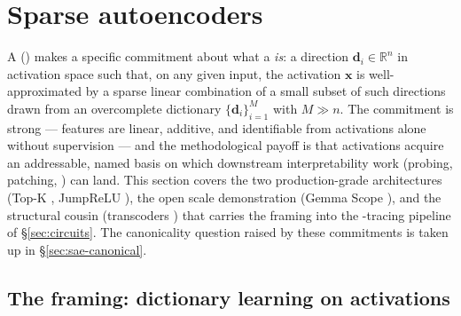 
\section{Sparse autoencoders}
\label{sec:sparse-autoencoders}

A  () makes a specific commitment about what a
 \emph{is}: a direction $\mathbf{d}_i \in \mathbb{R}^n$ in
activation space such that, on any given input, the activation
$\mathbf{x}$ is well-approximated by a sparse linear combination of a
small subset of such directions drawn from an overcomplete dictionary
$\{\mathbf{d}_i\}_{i=1}^M$ with $M \gg n$. The commitment is strong —
features are linear, additive, and identifiable from activations alone
without supervision — and the methodological payoff is that activations
acquire an addressable, named basis on which downstream interpretability
work (probing, patching, ) can land. This section covers
the two production-grade architectures (Top-K \citep{gao2024-topk-saes},
JumpReLU \citep{rajamanoharan2024-jumprelu}), the open scale
demonstration (Gemma Scope \citep{gemma-scope-2024}), and the structural
cousin (transcoders \citep{dunefsky2024-transcoders}) that carries the
framing into the -tracing pipeline of \S\ref{sec:circuits}. The
canonicality question raised by these commitments is taken up in
\S\ref{sec:sae-canonical}.

\subsection{The framing: dictionary learning on activations}
\label{sec:sae-framing}

